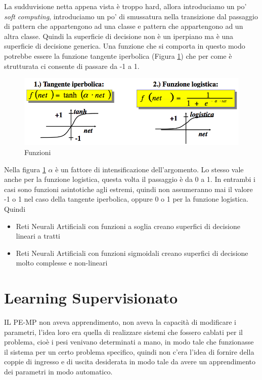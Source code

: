 \noindent La sudduvisione netta appena vista è troppo hard, allora introduciamo un po' \emph{soft computing}, introduciamo un po' di smussatura nella transizione dal passaggio di pattern che appartengono ad una classe e pattern che appartengono ad un altra classe.  Quindi la superficie di decisione non è un iperpiano ma è una superficie di decisione generica. Una funzione che si comporta in questo modo potrebbe essere la funzione tangente iperbolica (Figura \ref{funzioni}) che per come è strutturata ci consente di passare da -1 a 1.
\begin{figure}
\centering
\includegraphics[scale=0.5]{img/funzioni.png}
\caption{Funzioni}
\label{funzioni}
\end{figure}
Nella figura \ref{funzioni} $\alpha$ è un fattore di intensificazione dell'argomento. Lo stesso vale anche per la funzione logistica, questa volta il passaggio è da 0 a 1. In entrambi i casi sono funzioni asintotiche  agli estremi, quindi non assumeranno mai il valore -1 o 1 nel caso della tangente iperbolica, oppure 0 o 1 per la funzione logistica. Quindi
\begin{itemize}
\item Reti Neurali Artificiali con funzioni a soglia creano superfici di decisione lineari a tratti
\item Reti Neurali Artificiali con funzioni sigmoidali creano superfici di decisione molto complesse e non-lineari
\end{itemize}

\section{Learning Supervisionato}
IL PE-MP non aveva apprendimento, non aveva la capacità di modificare i parametri, l'idea loro era quella di realizzare sistemi che fossero cablati per il problema, cioè i pesi venivano determinati a mano, in modo tale che funzionasse il sistema per un certo problema specifico, quindi non c'era l'idea di fornire della coppie di ingresso e di uscita desiderata in modo tale da avere un apprendimento dei parametri in modo automatico. 

